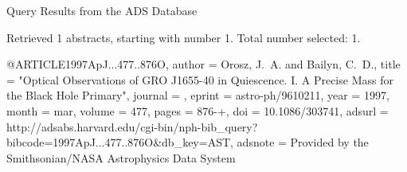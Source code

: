 Query Results from the ADS Database


Retrieved 1 abstracts, starting with number 1.  Total number selected: 1.

@ARTICLE{1997ApJ...477..876O,
   author = {{Orosz}, J.~A. and {Bailyn}, C.~D.},
    title = "{Optical Observations of GRO J1655-40 in Quiescence. I. A Precise Mass for the Black Hole Primary}",
  journal = {\apj},
   eprint = {astro-ph/9610211},
     year = 1997,
    month = mar,
   volume = 477,
    pages = {876-+},
      doi = {10.1086/303741},
   adsurl = {http://adsabs.harvard.edu/cgi-bin/nph-bib_query?bibcode=1997ApJ...477..876O&db_key=AST},
  adsnote = {Provided by the Smithsonian/NASA Astrophysics Data System}
}


